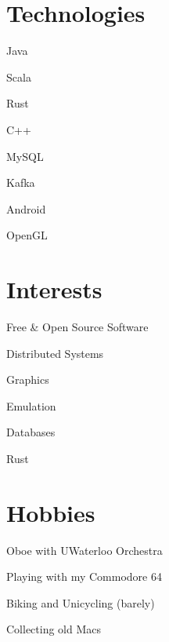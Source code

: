 \documentclass[12pt]{jmichaud-resume}
\begin{document}
	
\begin{minipage}[t]{0.3\textwidth}
\vspace{10pt}

\vspace{21pt}

\section{Technologies}
\vspace{7pt}
\begin{tightemize}
	\item Java
	\item Scala
	\item Rust
	\item C++
	\item MySQL
	\item Kafka
	\item Android
	\item OpenGL
\end{tightemize}

\vspace{15pt}

\section{Interests}
\vspace{7pt}
\begin{tightemize}
	\item Free \& Open Source Software
	\item Distributed Systems
	\item Graphics
	\item Emulation
	\item Databases
	\item Rust
\end{tightemize}

\vspace{20pt}

\section{Hobbies}
\vspace{7pt}
\begin{tightemize}
	\item Oboe with UWaterloo Orchestra
	\item Playing with my Commodore 64
	\item Biking and Unicycling (barely)
	\item Collecting old Macs
\end{tightemize}


\end{minipage}
\end{document}
